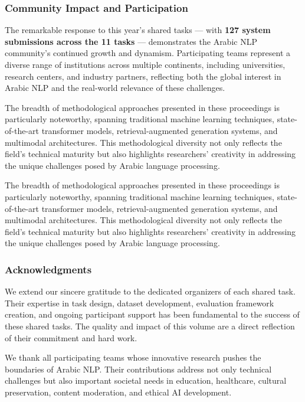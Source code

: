 \subsubsection*{\textbf{Community Impact and Participation}}

The remarkable response to this year’s shared tasks — with \textbf{127 system submissions across the 11 tasks} — demonstrates the Arabic NLP community’s continued growth and dynamism. Participating teams represent a diverse range of institutions across multiple continents, including universities, research centers, and industry partners, reflecting both the global interest in Arabic NLP and the real-world relevance of these challenges.

The breadth of methodological approaches presented in these proceedings is particularly noteworthy, spanning traditional machine learning techniques, state-of-the-art transformer models, retrieval-augmented generation systems, and multimodal architectures. This methodological diversity not only reflects the field’s technical maturity but also highlights researchers’ creativity in addressing the unique challenges posed by Arabic language processing.

The breadth of methodological approaches presented in these proceedings is particularly noteworthy, spanning traditional machine learning techniques, state-of-the-art transformer models, retrieval-augmented generation systems, and multimodal architectures. This methodological diversity not only reflects the field's technical maturity but also highlights researchers' creativity in addressing the unique challenges posed by Arabic language processing.

\subsubsection*{\textbf{Acknowledgments}}

We extend our sincere gratitude to the dedicated organizers of each shared task. Their expertise in task design, dataset development, evaluation framework creation, and ongoing participant support has been fundamental to the success of these shared tasks. The quality and impact of this volume are a direct reflection of their commitment and hard work.

We thank all participating teams whose innovative research pushes the boundaries of Arabic NLP. Their contributions address not only technical challenges but also important societal needs in education, healthcare, cultural preservation, content moderation, and ethical AI development.

